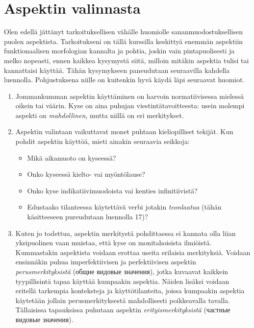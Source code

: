 \documentclass[]{scrreprt}
\providecommand{\tightlist}{%
  \setlength{\itemsep}{0pt}\setlength{\parskip}{0pt}}
\begin{document}
\section{Aspektin valinnasta}\label{aspektin-valinnasta}

Olen edellä jättänyt tarkoituksellisen vähälle huomiolle
sananmuodostuksellisen puolen aspektista. Tarkoitukseni on tällä
kurssilla keskittyä enemmän aspektiin funktionaalisen morfologian
kannalta ja pohtia, joskin vain pintapuolisesti ja melko nopeasti, ennen
kaikkea kysymystä siitä, milloin mitäkin aspektia tulisi tai kannattaisi
käyttää. Tähän kysymykseen paneudutaan seuraavilla kahdella luennolla.
Pohjustuksena niille on kuitenkin hyvä käydä läpi seuraavat huomiot.

\begin{enumerate}
\def\labelenumi{\arabic{enumi}.}
\tightlist
\item
  Jommankumman aspektin käyttäminen on harvoin normatiivisessa mielessä
  oikein tai väärin. Kyse on aina puhujan viestintätavoitteesta: usein
  molempi aspekti on \emph{mahdollinen}, mutta niillä on eri
  merkitykset.
\item
  Aspektin valintaan vaikuttavat monet puhtaan kieliopilliset tekijät.
  Kun pohdit aspektin käyttöä, mieti ainakin seuraavia seikkoja:

  \begin{itemize}
  \tightlist
  \item
    Mikä aikamuoto on kyseessä?
  \item
    Onko kyseessä kielto- vai myöntölause?
  \item
    Onko kyse indikatiivimuodoista vai kenties infinitiivistä?
  \item
    Edustaako tilanteessa käytettävä verbi jotakin \emph{teonlaatua}
    (tähän käsitteeseen pureudutaan luennolla 17)?
  \end{itemize}
\item
  Kuten jo todettua, aspektin merkitystä pohdittaessa ei kannata olla
  liian yksipuolinen vaan muistaa, että kyse on monitahoisista
  ilmiöistä. Kummastakin aspektista voidaan erottaa useita erilaisia
  merkityksiä. Voidaan ensinnäkin puhua imperfektiivisen ja
  perfektiivisen aspektin \emph{perusmerkityksistä} (общие видовые
  значения), jotka kuvaavat kaikkein tyypillisintä tapaa käyttää
  kumpaakin aspektia. Näiden lisäksi voidaan eritellä tarkempia
  konteksteja ja käyttötilanteita, joissa kumpaakin aspektia käytetään
  jollain perusmerkityksestä mahdollisesti poikkeavalla tavalla.
  Tällaisissa tapauksissa puhutaan aspektin \emph{erityismerkityksistä}
  (частные видовые значения).
\end{enumerate}
\end{document}
